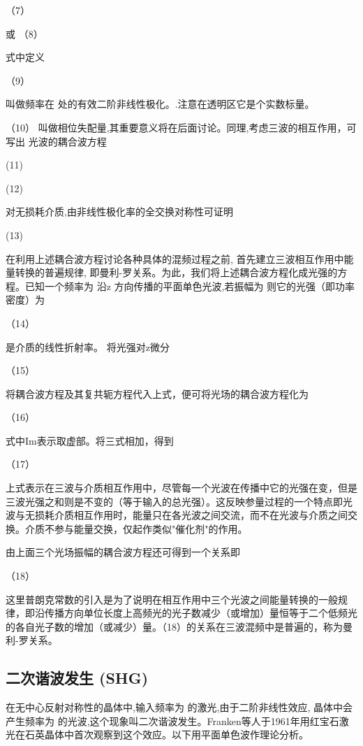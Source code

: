                 （7）                         

或                    （8）

式中定义

                   （9）                   

叫做频率在 处的有效二阶非线性极化。.注意在透明区它是个实数标量。

                                       （10）                                             
 叫做相位失配量,其重要意义将在后面讨论。同理,考虑三波的相互作用，可写出 光波的耦合波方程

                                          (11)

                                   (12)    

对无损耗介质,由非线性极化率的全交换对称性可证明

                   (13)    

在利用上述耦合波方程讨论各种具体的混频过程之前, 首先建立三波相互作用中能量转换的普遍规律, 即曼利-罗关系。为此，我们将上述耦合波方程化成光强的方程。已知一个频率为 沿z 方向传播的平面单色光波,若振幅为 则它的光强（即功率密度）为

                （14） 

   是介质的线性折射率。 将光强对z微分

                             （15）       

将耦合波方程及其复共轭方程代入上式，便可将光场的耦合波方程化为

                                  （16）                  

式中Im表示取虚部。将三式相加，得到

                  （17）                

上式表示在三波与介质相互作用中，尽管每一个光波在传播中它的光强在变，但是三波光强之和则是不变的（等于输入的总光强）。这反映参量过程的一个特点即光波与无损耗介质相互作用时，能量只在各光波之间交流，而不在光波与介质之间交换。介质不参与能量交换，仅起作类似"催化剂"的作用。

由上面三个光场振幅的耦合波方程还可得到一个关系即

                                   （18）

这里普朗克常数的引入是为了说明在相互作用中三个光波之间能量转换的一般规律，即沿传播方向单位长度上高频光的光子数减少（或增加）量恒等于二个低频光的各自光子数的增加（或减少）量。（18）的关系在三波混频中是普遍的，称为曼利-罗关系。


\subsection{二次谐波发生 (SHG) }
在无中心反射对称性的晶体中,输入频率为 的激光,由于二阶非线性效应, 晶体中会产生频率为 的光波,这个现象叫二次谐波发生。Franken等人于1961年用红宝石激光在石英晶体中首次观察到这个效应。以下用平面单色波作理论分析。

